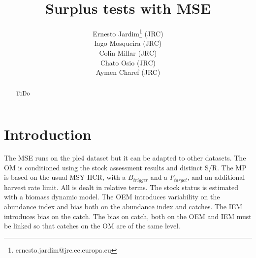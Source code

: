 \documentclass[a4paper]{article}
\begin{document}
\newcommand{\bm}[1]{\mbox{\boldmath $#1$}}
\newcommand{\func}[2]{#1 \Big( #2 \Big)}
\newcommand{\HCR}[1]{\func{\text{HCR}}{#1}}
\newcommand{\Unif}[1]{\func{\text{Uniform}}{#1}}
\newcommand{\LN}[1]{\func{\text{logNormal}}{#1}}
\newcommand{\intext}[1]{\quad \text{#1} \quad}
\newcommand{\TAC}{\text{TAC}}
\newcommand{\mybullet}{\textbullet \phantom{ }}
\title{Surplus tests with MSE}
\author{Ernesto Jardim\footnote{ernesto.jardim@jrc.ec.europa.eu} (JRC)\\ Iago Mosqueira (JRC) \\ Colin Millar (JRC)\\ Chato Osio (JRC)\\ Aymen Charef (JRC)}
\maketitle
\begin{abstract}
ToDo
\end{abstract} 

\pagebreak
\section{Introduction}

The MSE runs on the ple4 dataset but it can be adapted to other datasets. The OM is conditioned using the stock assessment results and distinct S/R. The MP is based on the usual MSY HCR, with a $B_{trigger}$ and a $F_{target}$, and an additional harvest rate limit. All is dealt in relative terms. The stock status is estimated with a biomass dynamic model. The OEM introduces variability on the abundance index and bias both on the abundance index and catches. The IEM introduces bias on the catch. The bias on catch, both on the OEM and IEM must be linked so that catches on the OM are of the same level.
\end{document}
